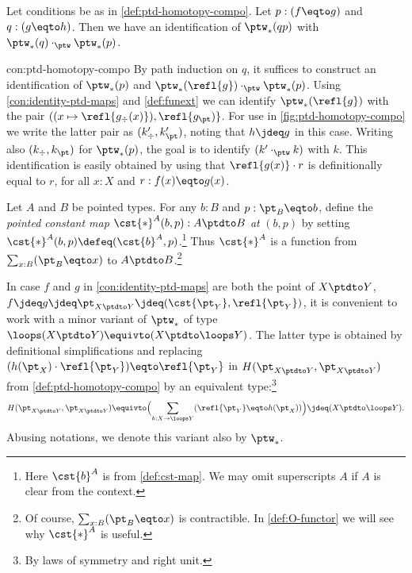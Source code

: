 \begin{construction}\label{con:ptd-homotopy-compo}
Let conditions be as in \cref{def:ptd-homotopy-compo}.
Let $p:(f\eqto g)$ and $q:(g\eqto h)$.
Then we have an identification of $\ptw_*(qp)$ with
$\ptw_*(q) \cdot_{\ptw} \ptw_*(p)$.
\end{construction}
\begin{implementation}{con:ptd-homotopy-compo}
By path induction on $q$, it suffices to construct an identification
of $\ptw_*(p)$ and $\ptw_*(\refl{g}) \cdot_{\ptw} \ptw_*(p)$.
Using \cref{con:identity-ptd-maps} and \cref{def:funext} we
can identify $\ptw_*(\refl{g})$ with the pair
$((x\mapsto\refl{g_\div(x)}),\refl{g_\pt)}$. 
For use in \cref{fig:ptd-homotopy-compo} we write the latter
pair as $(k'_\div,k'_\pt)$, noting that $h\jdeq g$ in this case.
Writing also $(k_\div,k_\pt)$ for $\ptw_*(p)$, the goal is to
identify $(k'\cdot_{\ptw} k)$ with $k$.
This identification is easily obtained by using
that $\refl{g(x)}\cdot r$ is definitionally equal to $r$,
for all $x:X$ and $r:f(x)\eqto g(x)$.
\end{implementation}

\begin{definition}\label{def:cst-ptd}
Let $A$ and $B$ be pointed types.
For any $b:B$ and $p:\pt_B\eqto b$, 
define the \emph{pointed constant map} $\cst{\ast}^A(b,p) : A\ptdto B$
\emph{at} $(b,p)$ by setting $\cst{\ast}^A(b,p)\defeq (\cst{b}^A,p)$.\footnote{%
Here $\cst{b}^A$ is from \cref{def:cst-map}.
We may omit superscripts $A$ if $A$ is clear from the context.}
Thus $\cst{\ast}^A$ is a function from $\sum_{x:B}(\pt_B\eqto x)$ to
$A\ptdto B$.\footnote{%
Of course, $\sum_{x:B}(\pt_B\eqto x)$ is contractible.
In \cref{def:O-functor} we will see why $\cst{\ast}^A$ is useful.}
\end{definition}

\begin{remark}\label{rem:loops-at-ptd-cst}
In case $f$ and $g$ in \cref{con:identity-ptd-maps} are both the point of
$X\ptdto Y$, \ie $f\jdeq g\jdeq\pt_{X\ptdto Y}\jdeq(\cst{\pt_Y},\refl{\pt_Y})$,
it is convenient to work with a minor variant of $\ptw_*$ of type 
$\loops({X\ptdto Y}) \equivto (X\ptdto\loops Y)$.
The latter type is obtained by definitional simplifications
and replacing $(h(\pt_X)\cdot \refl{\pt_Y})\eqto \refl{\pt_Y}$
in $H(\pt_{X\ptdto Y},\pt_{X\ptdto Y})$ from \cref{def:ptd-homotopy-compo}
by an equivalent type:\footnote{By laws of symmetry and right unit.}
\[ 
H(\pt_{X\ptdto Y},\pt_{X\ptdto Y}) \equivto 
\Bigl(\sum_{h:X\to\loops Y}(\refl{\pt_Y}\eqto h(\pt_X))\Bigr) \jdeq
(X\ptdto\loops Y).
\]
Abusing notations, we denote this variant also by $\ptw_*$.
\end{remark}


